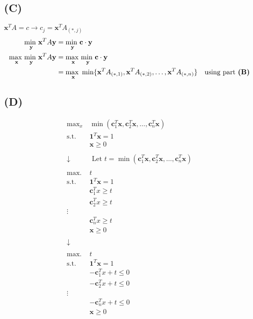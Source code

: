 \documentclass[12pt]{article}
\begin{document}
\newpage
\subsection*{(C)}
$\mathbf{x}^T A = c \xrightarrow{}{} c_j = \mathbf{x}^T A_{(*, j)}$
\begin{align*}
    \underset{\mathbf{y}}{\text{min }} \mathbf{x}^T A \mathbf{y} &= \underset{\mathbf{y}}{\text{min }} \mathbf{c} \cdot \mathbf{y} \\
    \underset{\mathbf{x}}{\text{max }} \underset{\mathbf{y}}{\text{min }} \mathbf{x}^T A \mathbf{y} &= \underset{\mathbf{x}}{\text{max }} \underset{\mathbf{y}}{\text{min }} \mathbf{c} \cdot \mathbf{y} \\
    &= \underset{\mathbf{x}}{\text{max }} \min \{\mathbf{x}^T A_{(*, 1)}, \mathbf{x}^T A_{(*, 2)}, \dots, \mathbf{x}^T A_{(*, n)}\} & \text{using part \textbf{(B)}}
\end{align*}

\subsection*{(D)}
\begin{align*}
    \text{max}_x & \min(\mathbf{c}_1^T\mathbf{x}, \mathbf{c}_2^T\mathbf{x}, \dots, \mathbf{c}_n^T\mathbf{x}) \\
    \text{s.t. } & \mathbf{1}^T \mathbf{x} = 1 \\
    & \mathbf{x} \geq 0 \\
    \\
    \downarrow & \text{ Let } t= \min(\mathbf{c}_1^T\mathbf{x}, \mathbf{c}_2^T\mathbf{x}, \dots, \mathbf{c}_n^T\mathbf{x}) \\
    \\
    \text{max. } & t \\
    \text{s.t. } & \mathbf{1}^T \mathbf{x} = 1 \\
    & \mathbf{c}_1^T x \geq t \\
    & \mathbf{c}_2^T x \geq t \\
    \vdots \\
    & \mathbf{c}_n^T x \geq t \\
    & \mathbf{x} \geq 0 \\
    \\
    \downarrow \\
    \\
    \text{max. } & t \\
    \text{s.t. } & \mathbf{1}^T \mathbf{x} = 1 \\
    & -\mathbf{c}_1^T x + t \leq 0 \\
    & -\mathbf{c}_2^T x + t \leq 0 \\
    \vdots \\
    & -\mathbf{c}_n^T x + t \leq 0 \\
    & \mathbf{x} \geq 0 \\
\end{align*}
\end{document}
